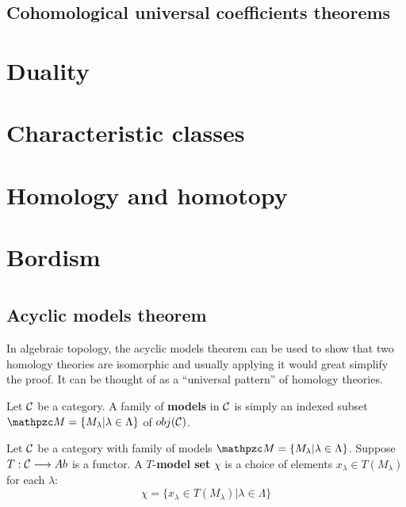 \documentclass[11pt]{book} %
\begin{document}
\section{Cohomological universal coefficients theorems}

\chapter{Duality}

\chapter{Characteristic classes}

\chapter{Homology and homotopy}

\chapter{Bordism}
\appendix
\chapter{}
\section{Acyclic models theorem}
In algebraic topology, the acyclic models theorem can be used to show that two homology theories are isomorphic and usually applying it would great simplify the proof. It can be thought of as a ``universal pattern'' of homology theories.
\begin{definition}Let ${\cal C}$ be a category.
A family of \textbf{models} in ${\cal C}$ is simply an indexed subset $\pzm=\{M_\lambda|\lambda\in \Lambda\}$ of $obj({\cal C})$.
\end{definition}

\begin{definition}
Let ${\cal C}$ be a category with family of models $\pzm=\{M_\lambda|\lambda\in \Lambda\}$.  Suppose $T:{\cal C}\longrightarrow Ab$ is a functor. A $T$-\textbf{model set} $\chi$ is a choice of elements $x_\lambda\in T(M_\lambda)$ for each $\lambda$:
$$
\chi=\{x_\lambda\in T(M_\lambda)|\lambda\in \Lambda\}
$$
\end{definition}
\end{document}
